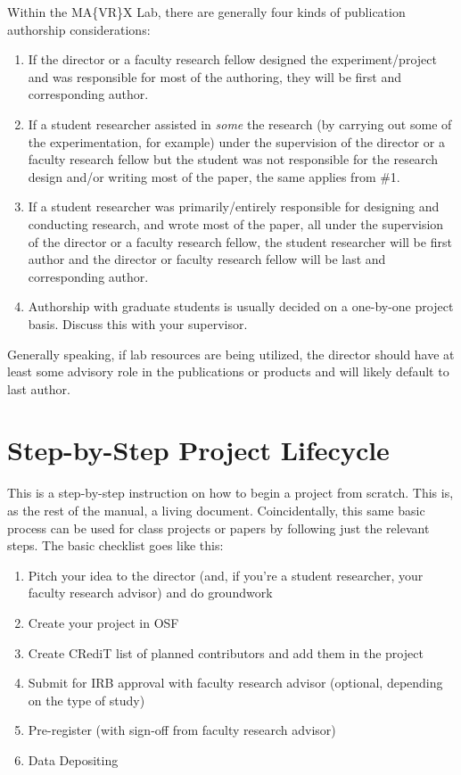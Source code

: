 \documentclass[]{tufte-book}
\providecommand{\tightlist}{%
  \setlength{\itemsep}{0pt}\setlength{\parskip}{0pt}}
\begin{document}
Within the MA\{VR\}X Lab, there are generally four kinds of publication authorship considerations:

\begin{enumerate}
\def\labelenumi{\arabic{enumi}.}
\tightlist
\item
  If the director or a faculty research fellow designed the experiment/project and was responsible for most of the authoring, they will be first and corresponding author.
\item
  If a student researcher assisted in \emph{some} the research (by carrying out some of the experimentation, for example) under the supervision of the director or a faculty research fellow but the student was not responsible for the research design and/or writing most of the paper, the same applies from \#1.
\item
  If a student researcher was primarily/entirely responsible for designing and conducting research, and wrote most of the paper, all under the supervision of the director or a faculty research fellow, the student researcher will be first author and the director or faculty research fellow will be last and corresponding author.
\item
  Authorship with graduate students is usually decided on a one-by-one project basis. Discuss this with your supervisor.
\end{enumerate}

Generally speaking, if lab resources are being utilized, the director should have at least some advisory role in the publications or products and will likely default to last author.

\hypertarget{appendix-appendix}{%
\appendix}


\hypertarget{step-by-step-project-lifecycle}{%
\chapter{Step-by-Step Project Lifecycle}\label{step-by-step-project-lifecycle}}

This is a step-by-step instruction on how to begin a project from scratch. This is, as the rest of the manual, a living document. Coincidentally, this same basic process can be used for class projects or papers by following just the relevant steps. The basic checklist goes like this:

\begin{enumerate}
\def\labelenumi{\arabic{enumi}.}
\tightlist
\item
  Pitch your idea to the director (and, if you're a student researcher, your faculty research advisor) and do groundwork
\item
  Create your project in OSF
\item
  Create CRediT list of planned contributors and add them in the project
\item
  Submit for IRB approval with faculty research advisor (optional, depending on the type of study)
\item
  Pre-register (with sign-off from faculty research advisor)
\item
  Data Depositing
\end{enumerate}
\end{document}
